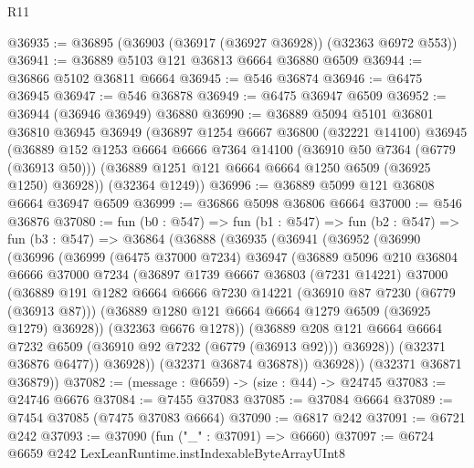 \begin{lexlean}{R11}
\begin{coremodule}
@36935 := @36895 (@36903 (@36917 (@36927 @36928)) (@32363 @6972 @553))
@36941 := @36889 @5103 @121 @36813 @6664 @36880 @6509
@36944 := @36866 @5102 @36811 @6664
@36945 := @546 @36874
@36946 := @6475 @36945
@36947 := @546 @36878
@36949 := @6475 @36947 @6509
@36952 := @36944 (@36946 @36949) @36880
@36990 := @36889
    @5094
    @5101
    @36801
    @36810
    @36945
    @36949
    (@36897
      @1254
      @6667
      @36800
      (@32221 @14100)
      @36945
      (@36889
        @152
        @1253
        @6664
        @6666
        @7364
        @14100
        (@36910 @50 @7364 (@6779 (@36913 @50)))
        (@36889 @1251 @121 @6664 @6664 @1250 @6509 (@36925 @1250) @36928))
      (@32364 @1249))
@36996 := @36889 @5099 @121 @36808 @6664 @36947 @6509
@36999 := @36866 @5098 @36806 @6664
@37000 := @546 @36876
@37080 := fun (b0 : @547) =>
  fun (b1 : @547) =>
  fun (b2 : @547) =>
  fun (b3 : @547) =>
  @36864
    (@36888
      (@36935
        (@36941
          (@36952
            (@36990
              (@36996
                (@36999
                  (@6475 @37000 @7234)
                  @36947
                  (@36889
                    @5096
                    @210
                    @36804
                    @6666
                    @37000
                    @7234
                    (@36897
                      @1739
                      @6667
                      @36803
                      (@7231 @14221)
                      @37000
                      (@36889
                        @191
                        @1282
                        @6664
                        @6666
                        @7230
                        @14221
                        (@36910 @87 @7230 (@6779 (@36913 @87)))
                        (@36889 @1280 @121 @6664 @6664 @1279 @6509 (@36925 @1279) @36928))
                      (@32363 @6676 @1278))
                    (@36889
                      @208
                      @121
                      @6664
                      @6664
                      @7232
                      @6509
                      (@36910 @92 @7232 (@6779 (@36913 @92)))
                      @36928))
                  (@32371 @36876 @6477))
                @36928))
            (@32371 @36874 @36878))
          @36928))
      (@32371 @36871 @36879))
@37082 := (message : @6659) -> (size : @44) -> @24745
@37083 := @24746 @6676
@37084 := @7455 @37083
@37085 := @37084 @6664
@37089 := @7454 @37085 (@7475 @37083 @6664)
@37090 := @6817 @242
@37091 := @6721 @242
@37093 := @37090 (fun ("_" : @37091) => @6660)
@37097 := @6724 @6659 @242 LexLeanRuntime.instIndexableByteArrayUInt8

\end{coremodule}
\end{lexlean}
